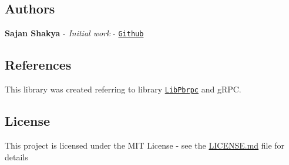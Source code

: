 \subsection*{Authors}


\begin{DoxyItemize}
\item {\bfseries Sajan Shakya} -\/ {\itshape Initial work} -\/ \href{https://github.com/sajanshakya129}{\tt Github}
\end{DoxyItemize}

\subsection*{References}

This library was created referring to library \href{https://github.com/madwyn/libpbrpc}{\tt Lib\+Pbrpc} and g\+R\+PC.

\subsection*{License}

This project is licensed under the M\+IT License -\/ see the \hyperlink{md_LICENSE}{L\+I\+C\+E\+N\+SE.md} file for details 